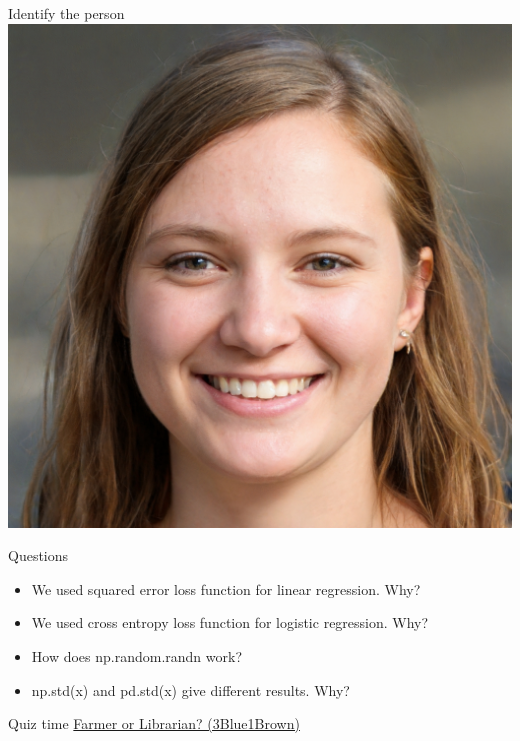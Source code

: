\documentclass[handout]{beamer}
\begin{document}
\begin{frame}{Identify the person}
    \includegraphics[height=\textwidth]{../figures/introduction/famous-2.jpeg}    
    \end{frame}


\begin{frame}{Questions}
    \begin{itemize}
        \item We used squared error loss function for linear regression. Why?
        \item We used cross entropy loss function for logistic regression. Why?
        \item How does np.random.randn work?
        \item np.std(x) and pd.std(x) give different results. Why?

    \end{itemize}
    
\end{frame}

\begin{frame}{Quiz time}
    \href{https://www.3blue1brown.com/lessons/bayes-theorem}{Farmer or Librarian? (3Blue1Brown)} 
\end{frame}
\end{document}
